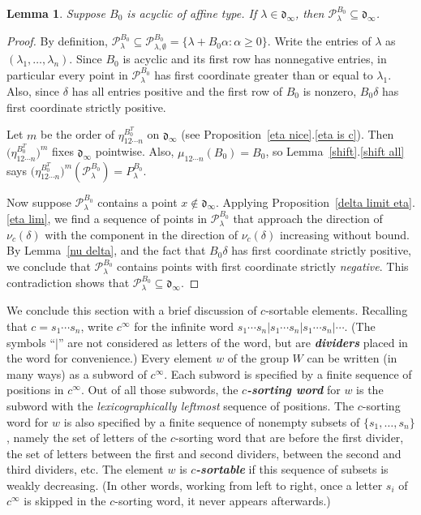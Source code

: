 \documentclass{amsart}
\newtheorem{lemma}[proposition]{Lemma}
\theoremstyle{definition}
\theoremstyle{remark}
\numberwithin{equation}{section}
\newcommand{\newword}[1]{\textbf{\emph{#1}}}
\newcommand{\set}[1]{{\lbrace #1 \rbrace}}
\newcommand{\0}{{\mathbf{0}}}
\renewcommand{\P}{\mathcal{P}}
\renewcommand{\d}{{\mathfrak d}}
\begin{document}
\begin{lemma}\label{P in dinf}
Suppose $B_0$ is acyclic of affine type.
If $\lambda\in\d_\infty$, then $\P^{B_0}_\lambda\subseteq\d_\infty$.
\end{lemma}
\begin{proof}
By definition, $\P^{B_0}_\lambda\subseteq\P^{B_0}_{\lambda,\emptyset}=\set{\lambda+B_0\alpha:\alpha\ge0}$.
Write the entries of $\lambda$ as $(\lambda_1,\ldots,\lambda_n)$.
Since $B_0$ is acyclic and its first row has nonnegative entries, in particular every point in $\P^{B_0}_\lambda$ has first coordinate greater than or equal to $\lambda_1$.
Also, since $\delta$ has all entries positive and the first row of $B_0$ is nonzero, $B_0\delta$ has first coordinate strictly positive.

Let $m$ be the order of $\eta^{B_0^T}_{12\cdots n}$ on $\d_\infty$ (see Proposition~\ref{eta nice}.\ref{eta is c}).
Then $\bigl(\eta^{B_0^T}_{12\cdots n}\bigr)^m$ fixes $\d_\infty$ pointwise.
Also, $\mu_{12\cdots n}(B_0)=B_0$, so Lemma~\ref{shift}.\ref{shift all} says ${\bigl(\eta^{B_0^T}_{12\cdots n}\bigr)^m(\P_\lambda^{B_0})=P_\lambda^{B_0}}$.

Now suppose $\P^{B_0}_\lambda$ contains a point $x\not\in\d_\infty$.
Applying Proposition~\ref{delta limit eta}.\ref{eta lim}, we find a sequence of points in $\P^{B_0}_\lambda$ that approach the direction of $\nu_c(\delta)$ with the component in the direction of $\nu_c(\delta)$ increasing without bound.
By Lemma~\ref{nu delta}, and the fact that $B_0\delta$ has first coordinate strictly positive, we conclude that $\P^{B_0}_\lambda$ contains points with first coordinate strictly \emph{negative}.
This contradiction shows that $\P^{B_0}_\lambda\subseteq\d_\infty$.
\end{proof}

We conclude this section with a brief discussion of $c$-sortable elements.  
Recalling that $c=s_1\cdots s_n$, write $c^\infty$ for the infinite word $s_1\cdots s_n|s_1\cdots s_n|s_1\cdots s_n|\cdots$.
(The symbols ``$|$'' are not considered as letters of the word, but are \newword{dividers} placed in the word for convenience.)
Every element $w$ of the group $W$ can be written (in many ways) as a subword of $c^\infty$.
Each subword is specified by a finite sequence of positions in $c^\infty$.
Out of all those subwords, the \newword{$c$-sorting word} for $w$ is the subword with the \emph{lexicographically leftmost} sequence of positions.
The $c$-sorting word for $w$ is also specified by a finite sequence of nonempty subsets of $\set{s_1,\ldots,s_n}$, namely the set of letters of the $c$-sorting word that are before the first divider, the set of letters between the first and second dividers, between the second and third dividers, etc.
The element $w$ is \newword{$c$-sortable} if this sequence of subsets is weakly decreasing.
(In other words, working from left to right, once a letter $s_i$ of $c^\infty$ is skipped in the $c$-sorting word, it never appears afterwards.)
\end{document}
